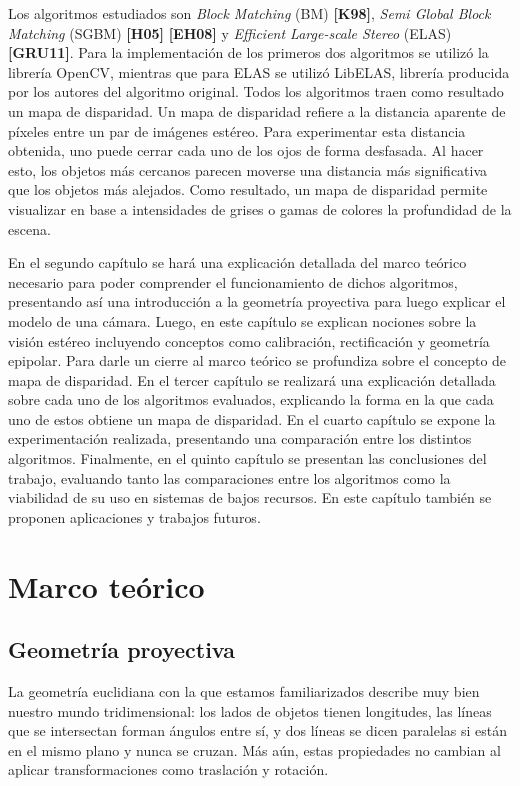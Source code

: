 \documentclass[11pt,a4paper,titlepage]{article}
\newcommand{\Cite}[1]{\textbf{[#1]}}
\begin{document}
Los algoritmos estudiados son \textit{Block Matching} (BM) \Cite{K98}, \textit{Semi Global Block Matching} (SGBM) \Cite{H05} \Cite{EH08} y \textit{Efficient Large-scale Stereo} (ELAS) \Cite{GRU11}. Para la implementación de los primeros dos algoritmos se utilizó la librería OpenCV, mientras que para ELAS se utilizó LibELAS, librería producida por los autores del algoritmo original. Todos los algoritmos traen como resultado un mapa de disparidad. Un mapa de disparidad refiere a la distancia aparente de píxeles entre un par de imágenes estéreo. Para experimentar esta distancia obtenida, uno puede cerrar cada uno de los ojos de forma desfasada. Al hacer esto, los objetos más cercanos parecen moverse una distancia más significativa que los objetos más alejados. Como resultado, un mapa de disparidad permite visualizar en base a intensidades de grises o gamas de colores la profundidad de la escena. 

En el segundo capítulo se hará una explicación detallada del marco teórico necesario para poder comprender el funcionamiento de dichos algoritmos, presentando así una introducción a la geometría proyectiva para luego explicar el modelo de una cámara. Luego, en este capítulo se explican nociones sobre la visión estéreo incluyendo conceptos como calibración, rectificación y geometría epipolar. Para darle un cierre al marco teórico se profundiza sobre el concepto de mapa de disparidad. En el tercer capítulo se realizará una explicación detallada sobre cada uno de los algoritmos evaluados, explicando la forma en la que cada uno de estos obtiene un mapa de disparidad. En el cuarto capítulo se expone la experimentación realizada, presentando una comparación entre los distintos algoritmos. Finalmente, en el quinto capítulo se presentan las conclusiones del trabajo, evaluando tanto las comparaciones entre los algoritmos como la viabilidad de su uso en sistemas de bajos recursos. En este capítulo también se proponen aplicaciones y trabajos futuros.

\newpage

\section{Marco teórico}

\subsection{Geometría proyectiva}

La geometría euclidiana con la que estamos familiarizados describe muy bien nuestro mundo tridimensional: los lados de objetos tienen longitudes, las líneas que se intersectan forman ángulos entre sí, y dos líneas se dicen paralelas si están en el mismo plano y nunca se cruzan. Más aún, estas propiedades no cambian al aplicar transformaciones como traslación y rotación.
\end{document}
